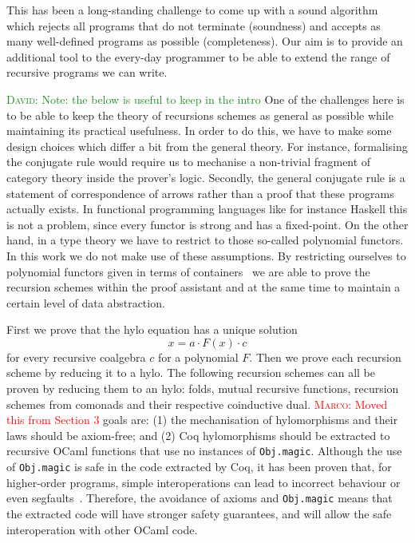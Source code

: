 \documentclass[a4paper, UKenglish, cleveref, autoref, thm-restate]{lipics-v2021}
\newcommand{\mpav}[1]{\textcolor{red}{\textsc{Marco}: #1}}
\newcommand{\dcas}[1]{\textcolor{ForestGreen}{\textsc{David}: #1}}
\newcommand{\comp}{\cdot}
\begin{document}
This has been a long-standing challenge to come up with a sound algorithm which
rejects all programs that do not terminate (soundness) and accepts as many
well-defined programs as possible (completeness). Our aim is to provide an
additional tool to the every-day programmer to be able to extend the range of
recursive programs we can write.

\dcas{Note: the below is useful to keep in the intro}
One of the challenges here is to be able to keep the theory of recursions
schemes as general as possible while maintaining its practical usefulness. In
order to do this, we have to make some design choices which differ a bit from
the general theory.  For instance, formalising the conjugate rule would require
us to mechanise a non-trivial fragment of category theory inside the prover's
logic.  Secondly, the general conjugate rule is a statement of correspondence of
arrows rather than a proof that these programs actually exists. In functional
programming languages like for instance Haskell this is not a problem, since
every functor is strong and has a fixed-point.  On the other hand, in a type
theory we have to restrict to those so-called polynomial functors. In this work
we do not make use of these assumptions. By restricting ourselves to polynomial
functors given in terms of containers~\cite{AbbottAG05} we are able to prove the
recursion schemes within the proof assistant and at the same time to maintain a
certain level of data abstraction.

First we prove that the hylo equation has a unique solution
\[
  x = a \comp F(x) \comp c
\]
for every recursive coalgebra $c$ for a polynomial $F$. Then we prove each
recursion scheme by reducing it to a hylo. The following recursion schemes can
all be proven by reducing them to an hylo: folds, mutual recursive functions,
recursion schemes from comonads and their respective coinductive dual.
\mpav{Moved this from Section 3}
goals are: (1) the
mechanisation of hylomorphisms and their laws should be axiom-free; and (2) Coq
hylomorphisms should be extracted to recursive OCaml functions that use no
instances of \texttt{Obj.magic}.  Although the use of
\texttt{Obj.magic} is safe in the code extracted by Coq, it has been
proven that, for higher-order programs, simple interoperations can lead to
incorrect behaviour or even segfaults~\cite{forster:hal-04329663}.  Therefore,
the avoidance of axioms and  \texttt{Obj.magic} means that the
extracted code will have stronger safety guarantees, and will allow the safe
interoperation with other OCaml code.
\end{document}
